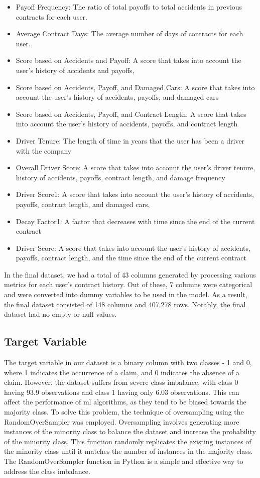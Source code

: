 \documentclass{IEEEtran}
\begin{document}
\begin{itemize}
\item Payoff Frequency: The ratio of total payoffs to total accidents in previous contracts for each user.
\item Average Contract Days: The average number of days of contracts for each user.
\item Score based on Accidents and Payoff: A score that takes into account the user's history of accidents and payoffs,
\item Score based on Accidents, Payoff, and Damaged Cars: A score that takes into account the user's history of accidents, payoffs, and damaged cars
\item Score based on Accidents, Payoff, and Contract Length: A score that takes into account the user's history of accidents, payoffs, and contract length
\item Driver Tenure: The length of time in years that the user has been a driver with the company
\item Overall Driver Score: A score that takes into account the user's driver tenure, history of accidents, payoffs, contract length, and damage frequency
\item Driver Score1: A score that takes into account the user's history of accidents, payoffs, contract length, and damaged cars,
\item Decay Factor1: A factor that decreases with time since the end of the current contract
\item Driver Score: A score that takes into account the user's history of accidents, payoffs, contract length, and the time since the end of the current contract
\end{itemize}


In the final dataset, we had a total of 43 columns generated by processing various metrics for each user's contract history. Out of these, 7 columns were categorical and were converted into dummy variables to be used in the model. As a result, the final dataset consisted of 148 columns and 407.278 rows. Notably, the final dataset had no empty or null values.


\subsection{Target Variable  }

The target variable in our dataset is a binary column with two classes - 1 and 0, where 1 indicates the occurrence of a claim, and 0 indicates the absence of a claim. However, the dataset suffers from severe class imbalance, with class 0 having 93.9\text{\%} observations and class 1 having only 6.03\text{\%} observations. This can affect the performance of ml algorithms, as they tend to be biased towards the majority class. To solve this problem, the technique of oversampling using the RandomOverSampler was employed. Oversampling involves generating more instances of the minority class to balance the dataset and increase the probability of the minority class. This function randomly replicates the existing instances of the minority class until it matches the number of instances in the majority class. The RandomOverSampler function in Python is a simple and effective way to address the class imbalance. 
\end{document}
